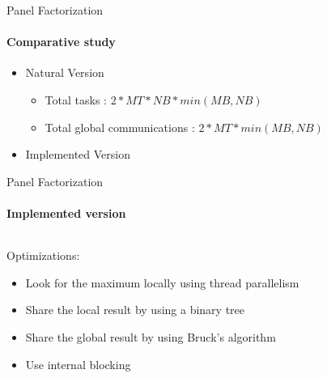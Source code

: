 \documentclass{beamer}
\begin{document}
\begin{frame}{Panel Factorization}
\framesubtitle{Comparative study}
\begin{itemize}
\item Natural Version
\begin{exampleblock}{}
\begin{itemize}
\item Total tasks : $2 * MT * NB * min(MB,NB)$
\item Total global communications : $2 * MT * min(MB,NB)$
\end{itemize}
\end{exampleblock}{}
\item Implemented Version
\end{itemize}
\end{frame}

\begin{frame}{Panel Factorization}
\framesubtitle{Implemented version}
\begin{columns}
\begin{column}{.70\textwidth}
Optimizations:
\begin{itemize}
\item Look for the maximum locally using thread parallelism
\item Share the local result by using a binary tree
\item Share the global result by using Bruck's algorithm
\item Use internal blocking
\end{itemize}
\end{column}
\hfill
\begin{column}{.30\textwidth}
\end{column}
\end{columns}
\end{frame}
\end{document}

